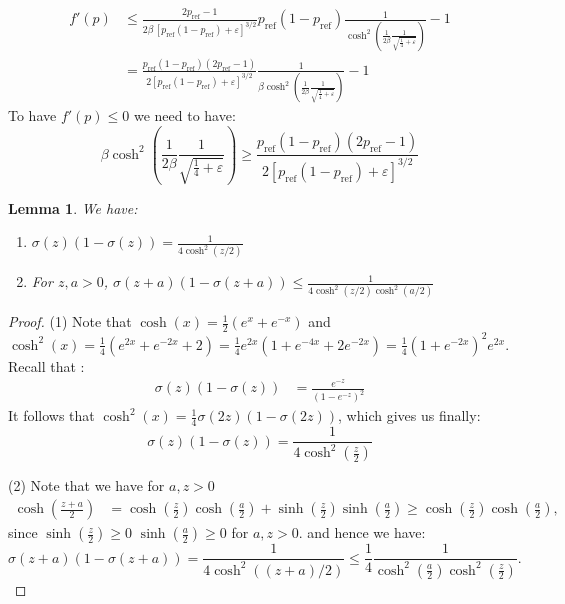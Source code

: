 \documentclass[11pt,reqno]{amsart}
\newtheorem{lemma}{Lemma}
\begin{document}
\begin{align*}
f'(p) &\leq  \frac{2p_{\mathrm{ref}}-1}{2\beta\,[p_{\mathrm{ref}}(1-p_{\mathrm{ref}})+\varepsilon]^{3/2}}   p_{\mathrm{ref}}(1-p_{\mathrm{ref}})  \frac{1}{ \cosh^2( \frac{1}{2\beta} \frac{1}{\sqrt{ \frac{1}{4} + \varepsilon}}) } -1\\
&= \frac{p_{\mathrm{ref}}(1-p_{\mathrm{ref}}) (2p_{\mathrm{ref}}-1)}{2[p_{\mathrm{ref}}(1-p_{\mathrm{ref}})+\varepsilon]^{3/2}} \frac{1}{\beta \cosh^2( \frac{1}{2\beta} \frac{1}{\sqrt{ \frac{1}{4} + \varepsilon}})}- 1
\end{align*}
To have $f'(p) \leq 0$ we need to have: 
$$\beta \cosh^2 \left( \frac{1}{2\beta} \frac{1}{\sqrt{ \frac{1}{4} + \varepsilon}}\right) \geq \frac{p_{\mathrm{ref}}(1-p_{\mathrm{ref}}) (2p_{\mathrm{ref}}-1)}{2[p_{\mathrm{ref}}(1-p_{\mathrm{ref}})+\varepsilon]^{3/2}} $$


\begin{lemma}
We have: 
\begin{enumerate}
\item $\sigma(z) (1-\sigma (z)) = \frac{1}{4 \cosh^2(z/2)}$
\item For $z,a >0$, $\sigma(z+a) (1-\sigma (z+a)) \leq \frac{1}{4 \cosh^2(z/2) \cosh^2(a/2) }  $  
\end{enumerate}
\end{lemma}
\begin{proof}
(1) Note that $\cosh(x) = \frac{1}{2} (e^{x} + e^{-x})$ and $\cosh^2(x) = \frac{1}{4} (e^{2x} + e^{-2x} +2) = \frac{1}{4} e^{2x} (1 + e^{-4x} + 2e^{-2x})  = \frac{1}{4} \left( 1+ e^{-2x}\right)^2 e^{2x} .$
Recall that :
\begin{align*}
 \sigma(z) (1-\sigma (z)) &= \frac{e^{-z}}{(1-e^{-z})^2}
\end{align*}
It follows that $\cosh^2(x)=  \frac{1}{4} \sigma(2z) (1-\sigma(2z))$, which gives us finally: 
\[ \sigma(z) (1-\sigma(z)) =\frac{1}{4 \cosh^2(\frac{z}{2})} \]

(2) Note that we have for $a,z>0$
\begin{align*}
 \cosh \left(\frac{z+a}{2}\right) &= \cosh\left(\frac{z}{2}\right) \cosh\left(\frac{a}{2}\right) + \sinh\left(\frac{z}{2}\right)\sinh\left(\frac{a}{2}\right)  
 \geq \cosh\left(\frac{z}{2}\right) \cosh\left(\frac{a}{2}\right),
 \end{align*}
 since $ \sinh\left(\frac{z}{2}\right)\geq 0$ $\sinh\left(\frac{a}{2}\right)\geq 0$ for $a,z>0$.
 and hence we have: 
 \[ \sigma(z+a) (1-\sigma (z+a)) = \frac{1}{4 \cosh^2((z+a)/2)} \leq \frac{1}{4} \frac{1}{\cosh^2(\frac{a}{2}) \cosh^2(\frac{z}{2})}.  \]
  \end{proof}
\end{document}
